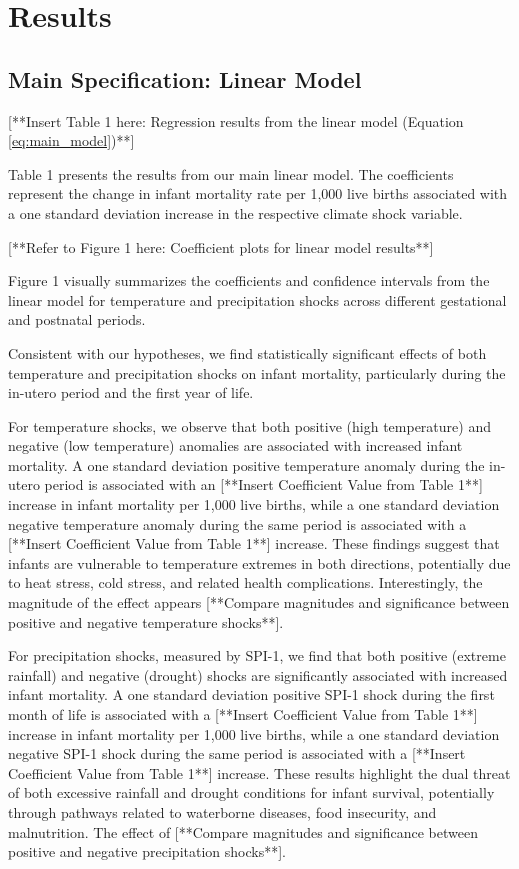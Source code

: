 \documentclass[12pt]{article}
\begin{document}
\section{Results} \label{sec:results}

\subsection{Main Specification: Linear Model}

[**Insert Table 1 here: Regression results from the linear model (Equation \ref{eq:main_model})**]

Table 1 presents the results from our main linear model.  The coefficients represent the change in infant mortality rate per 1,000 live births associated with a one standard deviation increase in the respective climate shock variable.

[**Refer to Figure 1 here: Coefficient plots for linear model results**]

Figure 1 visually summarizes the coefficients and confidence intervals from the linear model for temperature and precipitation shocks across different gestational and postnatal periods.

Consistent with our hypotheses, we find statistically significant effects of both temperature and precipitation shocks on infant mortality, particularly during the in-utero period and the first year of life.

For temperature shocks, we observe that both positive (high temperature) and negative (low temperature) anomalies are associated with increased infant mortality.  A one standard deviation positive temperature anomaly during the in-utero period is associated with an [**Insert Coefficient Value from Table 1**] increase in infant mortality per 1,000 live births, while a one standard deviation negative temperature anomaly during the same period is associated with a [**Insert Coefficient Value from Table 1**] increase.  These findings suggest that infants are vulnerable to temperature extremes in both directions, potentially due to heat stress, cold stress, and related health complications.  Interestingly, the magnitude of the effect appears [**Compare magnitudes and significance between positive and negative temperature shocks**].

For precipitation shocks, measured by SPI-1, we find that both positive (extreme rainfall) and negative (drought) shocks are significantly associated with increased infant mortality.  A one standard deviation positive SPI-1 shock during the first month of life is associated with a [**Insert Coefficient Value from Table 1**] increase in infant mortality per 1,000 live births, while a one standard deviation negative SPI-1 shock during the same period is associated with a [**Insert Coefficient Value from Table 1**] increase. These results highlight the dual threat of both excessive rainfall and drought conditions for infant survival, potentially through pathways related to waterborne diseases, food insecurity, and malnutrition. The effect of [**Compare magnitudes and significance between positive and negative precipitation shocks**].
\end{document}
